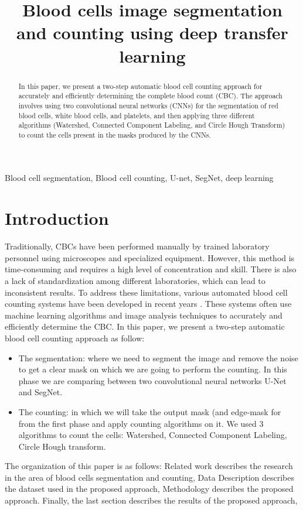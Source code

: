 \documentclass[conference]{IEEEtran}
\begin{document}
\title{Blood cells image segmentation and counting using deep transfer learning}
\author{
}
\maketitle
\begin{abstract}
In this paper, we present a two-step automatic blood cell counting approach for accurately and efficiently determining the complete blood count (CBC). The approach involves using two convolutional neural networks (CNNs) for the segmentation of red blood cells, white blood cells, and platelets, and then applying three different algorithms (Watershed, Connected Component Labeling, and Circle Hough Transform) to count the cells present in the masks produced by the CNNs.
\end{abstract}
\begin{IEEEkeywords}
Blood cell segmentation, Blood cell counting, U-net, SegNet, deep learning
\end{IEEEkeywords}

\section{Introduction}
Traditionally, CBCs have been performed manually by trained laboratory personnel using microscopes and specialized equipment. However, this method is time-consuming and requires a high level of concentration and skill. There is also a lack of standardization among different laboratories, which can lead to inconsistent results.
To address these limitations, various automated blood cell counting systems have been developed in recent years \cite{ref1}. These systems often use machine learning algorithms and image analysis techniques to accurately and efficiently determine the CBC.
In this paper, we present a two-step automatic blood cell counting approach as follow: 
\begin{itemize}
\item The segmentation: where we need to segment the image and remove the noise to get a clear mask on which we are going to perform the counting. In this phase we are comparing between two convolutional neural networks U-Net and SegNet.
\item The counting: in which we will take the output mask (and edge-mask for from the first phase and apply counting algorithms on it. We used 3 algorithms to count the cells: Watershed, Connected Component Labeling, Circle Hough transform.
\end{itemize}
The organization of this paper is as follows: Related work describes the research in the area of blood cells segmentation and counting, Data Description describes the dataset used in the proposed approach, Methodology describes the proposed approach. Finally, the last section describes the results of the proposed approach,
\end{document}
